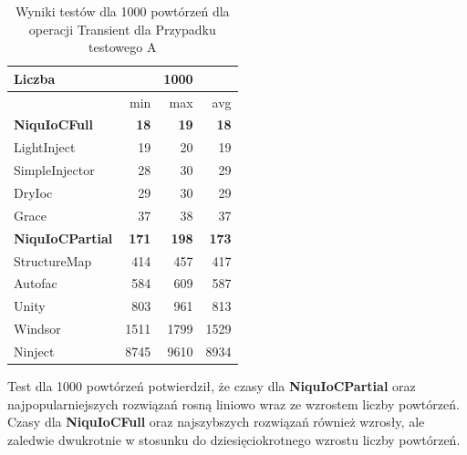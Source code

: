 \documentclass[12pt]{article}
\begin{document}
\begin{table}[H]
\captionsetup{belowskip=0pt,aboveskip=0pt}
\begin{center}
\begin{small}
	\begin{tabular}{ | l | r r r | }
    		\hline
Liczba & & 1000 & \\ \hline
 & min & max & avg \\ \hline
\textbf{NiquIoCFull} & \textbf{18} & \textbf{19} & \textbf{18} \\ \hline
LightInject & 19 & 20 & 19 \\ \hline
SimpleInjector & 28 & 30 & 29 \\ \hline
DryIoc & 29 & 30 & 29 \\ \hline
Grace & 37 & 38 & 37 \\ \hline
\textbf{NiquIoCPartial} & \textbf{171} & \textbf{198} & \textbf{173} \\ \hline
StructureMap & 414 & 457 & 417 \\ \hline
Autofac & 584 & 609 & 587 \\ \hline
Unity & 803 & 961 & 813 \\ \hline
Windsor & 1511 & 1799 & 1529 \\ \hline
Ninject & 8745 & 9610 & 8934 \\ \hline
  	\end{tabular}
\end{small}
\end{center}
\caption{Wyniki testów dla 1000 powtórzeń dla operacji Transient dla Przypadku testowego A}
\label{TestCaseA_Transient1000}
\end{table}
Test dla 1000 powtórzeń potwierdził, że czasy dla \textbf{NiquIoCPartial} oraz najpopularniejszych rozwiązań rosną liniowo wraz ze wzrostem liczby powtórzeń. Czasy dla \textbf{NiquIoCFull} oraz najszybszych rozwiązań również wzrosły, ale zaledwie dwukrotnie w stosunku do dziesięciokrotnego wzrostu liczby powtórzeń.
\end{document}
